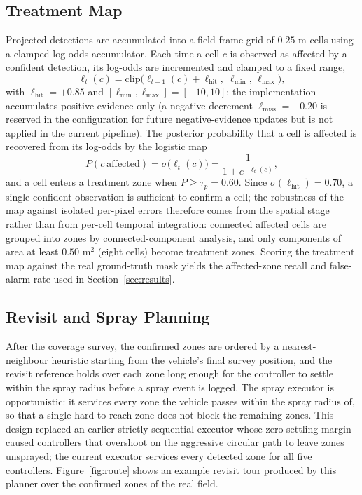 \documentclass[12pt,a4paper]{article}
\begin{document}
\subsection{Treatment Map}
Projected detections are accumulated into a field-frame grid of $0.25$ m cells using a
clamped log-odds accumulator. Each time a cell $c$ is observed as affected by a confident
detection, its log-odds are incremented and clamped to a fixed range,
\begin{equation}
    \ell_t(c) = \mathrm{clip}\!\big(\ell_{t-1}(c) + \ell_{\mathrm{hit}},\; \ell_{\min},\, \ell_{\max}\big),
    \label{eq:logodds}
\end{equation}
with $\ell_{\mathrm{hit}}=+0.85$ and $[\ell_{\min},\ell_{\max}]=[-10,10]$; the
implementation accumulates positive evidence only (a negative decrement
$\ell_{\mathrm{miss}}=-0.20$ is reserved in the configuration for future
negative-evidence updates but is not applied in the current pipeline). The posterior
probability that a cell is affected is recovered from its log-odds by the logistic map
\begin{equation}
    P(c\ \text{affected}) = \sigma\big(\ell_t(c)\big) = \frac{1}{1+e^{-\ell_t(c)}},
    \label{eq:sigmoid}
\end{equation}
and a cell enters a treatment zone when $P \ge \tau_p = 0.60$. Since
$\sigma(\ell_{\mathrm{hit}}) = 0.70$, a single confident observation is sufficient to
confirm a cell; the robustness of the map against isolated per-pixel errors therefore
comes from the spatial stage rather than from per-cell temporal integration: connected
affected cells are grouped into zones by connected-component analysis, and only components
of area at least $0.50$ m$^2$ (eight cells) become treatment zones. Scoring the treatment
map against the real ground-truth mask yields the affected-zone recall and false-alarm
rate used in Section~\ref{sec:results}.

\subsection{Revisit and Spray Planning}
After the coverage survey, the confirmed zones are ordered by a nearest-neighbour
heuristic starting from the vehicle's final survey position, and the revisit
reference holds over each zone long enough for the controller to settle within the
spray radius before a spray event is logged. The spray executor is opportunistic:
it services every zone the vehicle passes within the spray radius of, so that a
single hard-to-reach zone does not block the remaining zones. This design replaced
an earlier strictly-sequential executor whose zero settling margin caused
controllers that overshoot on the aggressive circular path to leave zones unsprayed;
the current executor services every detected zone for all five controllers.
Figure~\ref{fig:route} shows an example revisit tour produced by this planner over the
confirmed zones of the real field.
\end{document}
